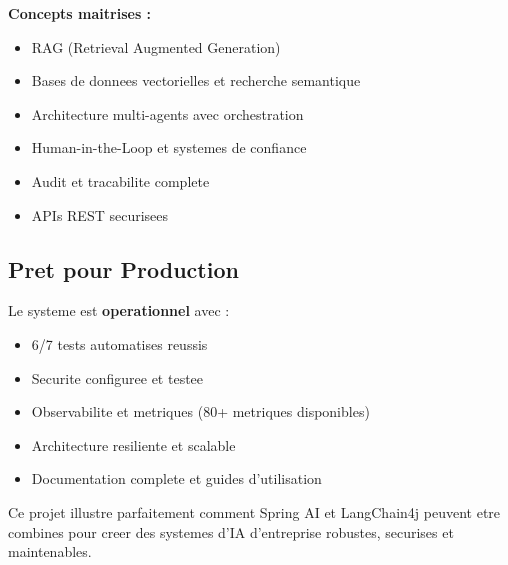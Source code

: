\documentclass[a4paper,12pt]{article}
\begin{document}
\textbf{Concepts maitrises :}
\begin{itemize}
    \item RAG (Retrieval Augmented Generation)
    \item Bases de donnees vectorielles et recherche semantique
    \item Architecture multi-agents avec orchestration
    \item Human-in-the-Loop et systemes de confiance
    \item Audit et tracabilite complete
    \item APIs REST securisees
\end{itemize}

\subsection{Pret pour Production}

Le systeme est \textbf{operationnel} avec :
\begin{itemize}
    \item [SUCCES] 6/7 tests automatises reussis
    \item [SUCCES] Securite configuree et testee
    \item [SUCCES] Observabilite et metriques (80+ metriques disponibles)
    \item [SUCCES] Architecture resiliente et scalable
    \item [SUCCES] Documentation complete et guides d'utilisation
\end{itemize}

Ce projet illustre parfaitement comment Spring AI et LangChain4j peuvent etre combines pour creer des systemes d'IA d'entreprise robustes, securises et maintenables.
\end{document}
